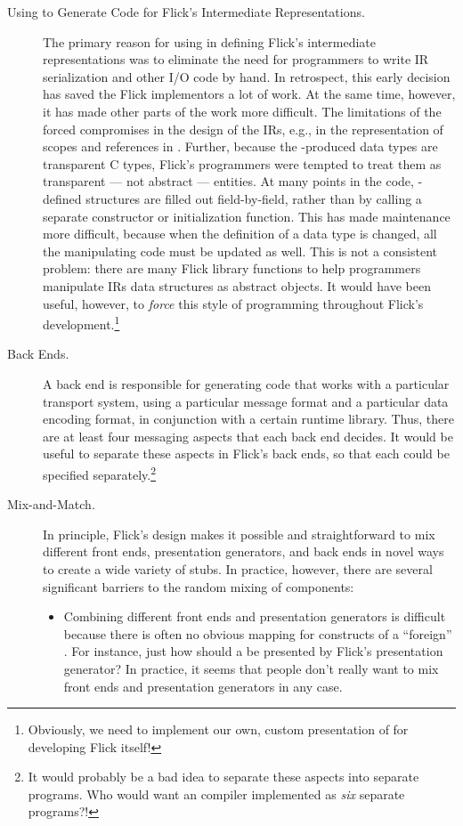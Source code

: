 \begin{description}
  \item[Using \rpcgen{} to Generate Code for Flick's Intermediate
  Representations.]
  The primary reason for using \rpcgen{} in defining Flick's intermediate
  representations was to eliminate the need for programmers to write IR
  serialization and other I/O code by hand.  In retrospect, this early decision
  has saved the Flick implementors a lot of work.  At the same time, however,
  it has made other parts of the work more difficult.  The limitations of the
  \ONCRPC{} \IDL{} forced compromises in the design of the IRs, e.g., in the
  representation of scopes and references in \AOI{}.  Further, because the
  \rpcgen{}-produced data types are transparent C types, Flick's programmers
  were tempted to treat them as transparent --- not abstract --- entities.  At
  many points in the code, \rpcgen{}-defined structures are filled out
  field-by-field, rather than by calling a separate constructor or
  initialization function.  This has made maintenance more difficult, because
  when the \ONCRPC{} \IDL{} definition of a data type is changed, all the
  manipulating code must be updated as well.
  This is not a consistent problem: there are many Flick library functions to
  help programmers manipulate IRs data structures as abstract objects.  It
  would have been useful, however, to \emph{force} this style of programming
  throughout Flick's development.\footnote{Obviously, we need to implement our
  own, custom presentation of \ONCRPC{} \IDL{} for developing Flick itself!}

  \item[Back Ends.]
  A back end is responsible for generating code that works with a particular
  transport system, using a particular message format and a particular data
  encoding format, in conjunction with a certain runtime library.  Thus, there
  are at least four messaging aspects that each back end decides.  It would be
  useful to separate these aspects in Flick's back ends, so that each could be
  specified separately.\footnote{It would probably be a bad idea to separate
  these aspects into separate programs.  Who would want an \IDL{} compiler
  implemented as \emph{six} separate programs?!}

  \item[Mix-and-Match.]
  In principle, Flick's design makes it possible and straightforward to mix
  different front ends, presentation generators, and back ends in novel ways to
  create a wide variety of stubs.  In practice, however, there are several
  significant barriers to the random mixing of components:
  \begin{itemize}
    \item Combining different front ends and presentation generators is
    difficult because there is often no obvious mapping for constructs of a
    ``foreign'' \IDL{}\@.  For instance, just how should a \CORBA{} \IDL{}
     be presented by Flick's \ONCRPC{} presentation generator?
    In practice, it seems that people don't really want to mix front ends and
    presentation generators in any case.


\end{itemize}
\end{description}
